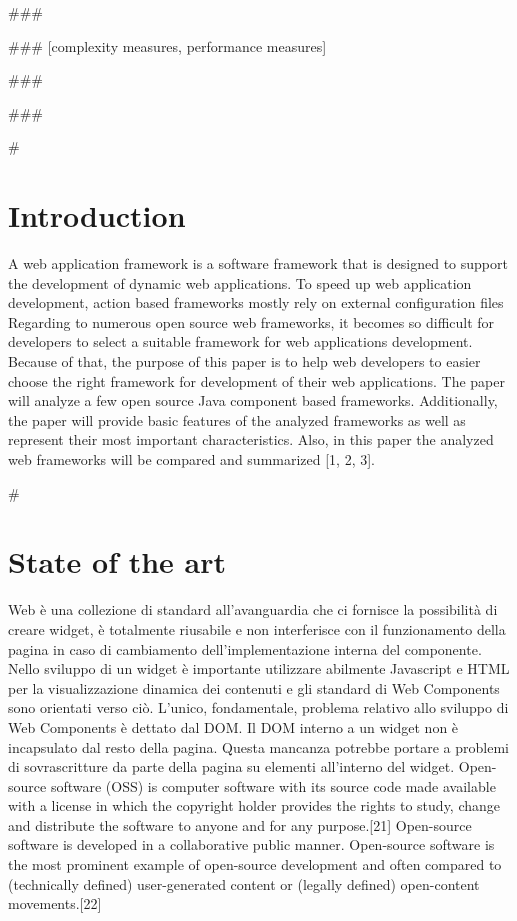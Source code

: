 \documentclass{sig-alternate}
\begin{document}
### 

### [complexity measures, performance measures]

### 

### 




# \section{Introduction}

A web application framework is a software framework that is designed to support the development of dynamic web applications.
To speed up web application development, action based frameworks mostly rely on external configuration files
Regarding to numerous open source web frameworks, it becomes so difficult for developers to select a suitable framework for web applications development. Because of that, the purpose of this paper is to help web developers to easier choose the right framework for development of their web applications. The paper will analyze a few open source Java component based frameworks. Additionally, the paper will provide basic features of the analyzed frameworks as well as represent their most important characteristics. Also, in this paper the analyzed web frameworks will be compared and summarized [1, 2, 3].

# \section{State of the art}

Web  è una collezione di standard all'avanguardia che ci fornisce la possibilità di creare widget, è totalmente riusabile e non interferisce con il funzionamento della pagina in caso di cambiamento dell'implementazione interna del componente.
Nello sviluppo di un widget è importante utilizzare abilmente Javascript e HTML per la visualizzazione dinamica dei contenuti e gli standard di Web Components sono orientati verso ciò. L'unico, fondamentale, problema relativo allo sviluppo di Web Components è dettato dal DOM. Il DOM interno a un widget non è incapsulato dal resto della pagina. Questa mancanza potrebbe portare a problemi di sovrascritture da parte della pagina su elementi all'interno del widget.
Open-source software (OSS) is computer software with its source code made available with a license in which the copyright holder provides the rights to study, change and distribute the software to anyone and for any purpose.[21] Open-source software is developed in a collaborative public manner. Open-source software is the most prominent example of open-source development and often compared to (technically defined) user-generated content or (legally defined) open-content movements.[22]
\end{document}
